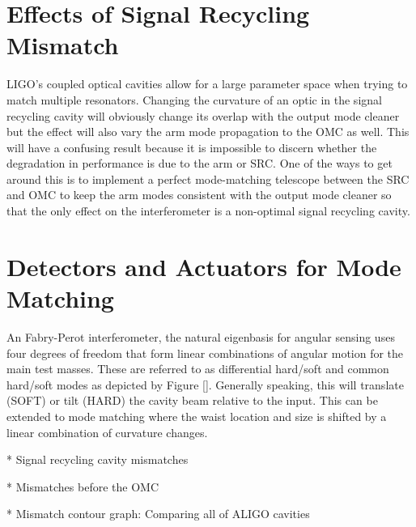 	\section{Effects of Signal Recycling Mismatch}
		LIGO's coupled optical cavities allow for a large parameter space when trying to match multiple resonators.   Changing the curvature of an optic in the signal recycling cavity will obviously change its overlap with the output mode cleaner but the effect will also vary the arm mode propagation to the OMC as well.  This will have a confusing result because it is impossible to discern whether the degradation in performance is due to the arm or SRC.  One of the ways to get around this is to implement a perfect mode-matching telescope between the SRC and OMC to keep the arm modes consistent with the output mode cleaner so that the only effect on the interferometer is a non-optimal signal recycling cavity.
		
	\section{Detectors and Actuators for Mode Matching}
	An Fabry-Perot interferometer, the natural eigenbasis for angular sensing uses four degrees of freedom that form linear combinations of angular motion for the main test masses.  These are referred to as differential hard/soft and common hard/soft modes as depicted by Figure [].  Generally speaking, this will translate (SOFT) or tilt (HARD) the cavity beam relative to the input.  This can be extended to mode matching where the waist location and size is shifted by a linear combination of curvature changes.
	
		* Signal recycling cavity mismatches

		* Mismatches before the OMC
			
		* Mismatch contour graph: Comparing all of ALIGO cavities
		